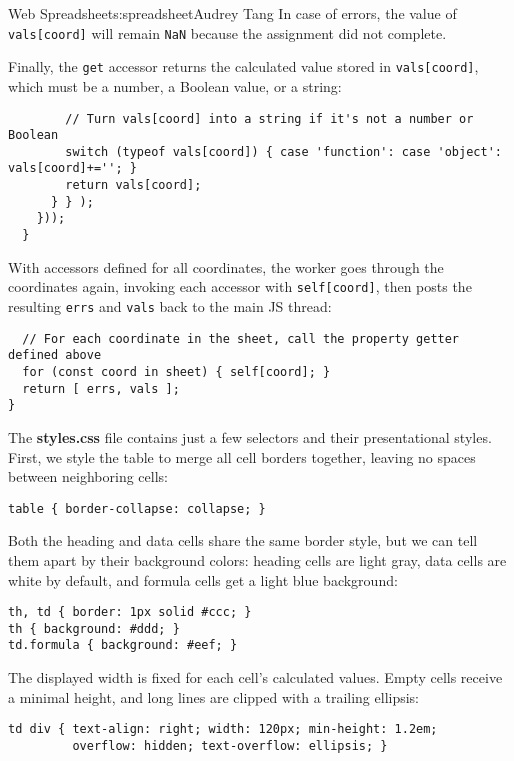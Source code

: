 \begin{aosachapter}{Web Spreadsheet}{s:spreadsheet}{Audrey Tang}
In case of errors, the value of \texttt{vals{[}coord{]}} will remain
\texttt{NaN} because the assignment did not complete.

Finally, the \texttt{get} accessor returns the calculated value stored
in \texttt{vals{[}coord{]}}, which must be a number, a Boolean value, or
a string:

\begin{verbatim}
        // Turn vals[coord] into a string if it's not a number or Boolean
        switch (typeof vals[coord]) { case 'function': case 'object': vals[coord]+=''; }
        return vals[coord];
      } } );
    }));
  }
\end{verbatim}

With accessors defined for all coordinates, the worker goes through the
coordinates again, invoking each accessor with \texttt{self{[}coord{]}},
then posts the resulting \texttt{errs} and \texttt{vals} back to the
main JS thread:

\begin{verbatim}
  // For each coordinate in the sheet, call the property getter defined above
  for (const coord in sheet) { self[coord]; }
  return [ errs, vals ];
}
\end{verbatim}

\label{css}

The \textbf{styles.css} file contains just a few selectors and their
presentational styles. First, we style the table to merge all cell
borders together, leaving no spaces between neighboring cells:

\begin{verbatim}
table { border-collapse: collapse; }
\end{verbatim}

Both the heading and data cells share the same border style, but we can
tell them apart by their background colors: heading cells are light
gray, data cells are white by default, and formula cells get a light
blue background:

\begin{verbatim}
th, td { border: 1px solid #ccc; }
th { background: #ddd; }
td.formula { background: #eef; }
\end{verbatim}

The displayed width is fixed for each cell's calculated values. Empty
cells receive a minimal height, and long lines are clipped with a
trailing ellipsis:

\begin{verbatim}
td div { text-align: right; width: 120px; min-height: 1.2em;
         overflow: hidden; text-overflow: ellipsis; }
\end{verbatim}


\end{aosachapter}
